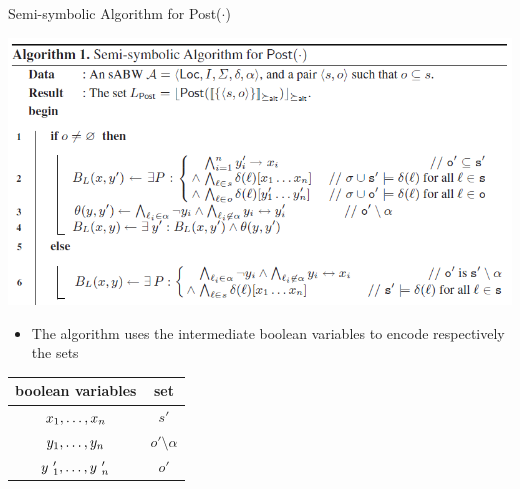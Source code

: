 \documentclass[12pt]{beamer}
\begin{document}
\begin{frame}{Semi-symbolic Algorithm for Post($\cdot$)}
	\label{Algorithm1_part1}
	\begin{center}
		\includegraphics[scale=0.5]{Algorithm1_part1}
	\end{center}
	\begin{minipage}{.6\textwidth}
		\begin{itemize}
			\item The algorithm uses the intermediate boolean variables to encode respectively the sets 
		\end{itemize}
	\end{minipage}%
	\begin{minipage}{.4\textwidth}
		\small
		\centering
		\begin{tabular}{ ||c|c|| } 
			\hline
			boolean variables & set \\
			\hline \hline
			$\mathnormal{x}_{1},\dots , \mathnormal{x}_\mathnormal{n}$ & $s'$ \\
			\hline 
			$\mathnormal{y}_{1},\dots , \mathnormal{y}_\mathnormal{n}$ & $o' \setminus \alpha$ \\ 
			\hline
			$\mathnormal{y}~'_{1},\dots , \mathnormal{y}~'_\mathnormal{n}$ & $o'$ \\ 
			\hline
		\end{tabular}
	\end{minipage}
\end{frame}
\end{document}
